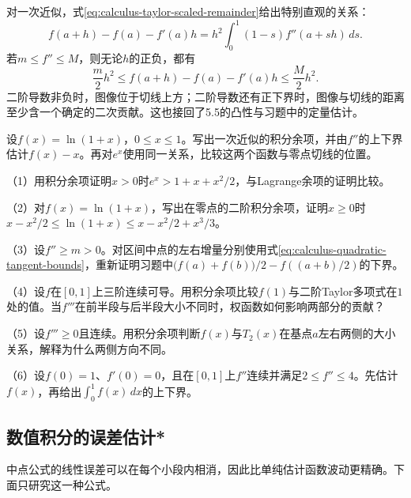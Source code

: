 对一次近似，式\eqref{eq:calculus-taylor-scaled-remainder}给出特别直观的关系：
\begin{equation*}
 f(a+h)-f(a)-f'(a)h=h^2\int_0^1(1-s)f''(a+sh)\,ds.
\end{equation*}
若\(m\le f''\le M\)，则无论\(h\)的正负，都有
\begin{equation}\label{eq:calculus-quadratic-tangent-bounds}
 \frac m2h^2\le f(a+h)-f(a)-f'(a)h\le\frac M2h^2.
\end{equation}
二阶导数非负时，图像位于切线上方；二阶导数还有正下界时，图像与切线的距离至少含一个确定的二次贡献。这也接回了5.5的凸性与习题中的定量估计。

\begin{example}
设\(f(x)=\ln(1+x)\)，\(0\le x\le1\)。写出一次近似的积分余项，并由\(f''\)的上下界估计\(f(x)-x\)。再对\(e^x\)使用同一关系，比较这两个函数与零点切线的位置。
\end{example}

\begin{exercise}
\mbox{}\par\nobreak

（1）用积分余项证明\(x>0\)时\(e^x>1+x+x^2/2\)，与Lagrange余项的证明比较。

（2）对\(f(x)=\ln(1+x)\)，写出在零点的二阶积分余项，证明\(x\ge0\)时\(x-x^2/2\le\ln(1+x)\le x-x^2/2+x^3/3\)。

（3）设\(f''\ge m>0\)。对区间中点的左右增量分别使用式\eqref{eq:calculus-quadratic-tangent-bounds}，重新证明习题中\(\bigl(f(a)+f(b)\bigr)/2-f((a+b)/2)\)的下界。

（4）设\(f\)在\([0,1]\)上三阶连续可导。用积分余项比较\(f(1)\)与二阶Taylor多项式在\(1\)处的值。当\(f'''\)在前半段与后半段大小不同时，权函数如何影响两部分的贡献？

（5）设\(f'''\ge0\)且连续。用积分余项判断\(f(x)\)与\(T_2(x)\)在基点\(a\)左右两侧的大小关系，解释为什么两侧方向不同。

\begin{samepage}
（6）设\(f(0)=1\)、\(f'(0)=0\)，且在\([0,1]\)上\(f''\)连续并满足\(2\le f''\le4\)。先估计\(f(x)\)，再给出\(\int_0^1f(x)\,dx\)的上下界。
\par
\end{samepage}
\end{exercise}

\subsection{数值积分的误差估计*}

中点公式的线性误差可以在每个小段内相消，因此比单纯估计函数波动更精确。下面只研究这一种公式。

